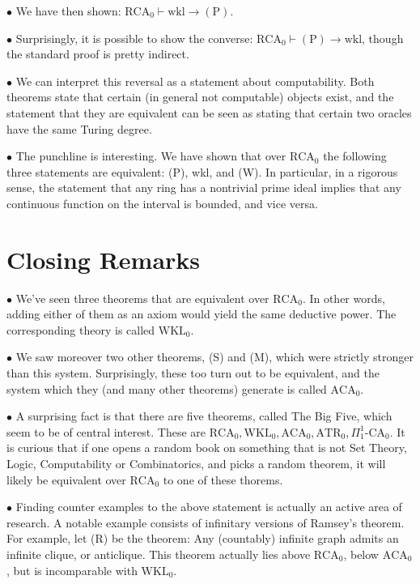 \documentclass{article}
\theoremstyle{nonumberplain}
\newcommand{\RCA}{\mathrm{RCA}}
\newcommand{\WKL}{\mathrm{WKL}}
\newcommand{\ACA}{\mathrm{ACA}}
\newcommand{\wkl}{\mathrm{wkl}}
\newcommand\point[1]{\noindent \hspace{\labelsep} $\bullet$ #1 \smallskip}
\newcommand\thname[1]{\mathrm{(#1)}}
\begin{document}
\point{We have then shown: $\RCA_0 \vdash \wkl \rightarrow \thname P$.}

\point{Surprisingly, it is possible to show the converse: $\RCA_0 \vdash \thname P \rightarrow \wkl$, though the standard proof is pretty indirect.}

\point{We can interpret this reversal as a statement about computability. Both theorems state that certain (in general not computable) objects exist, and the statement that they are equivalent can be seen as stating that certain two oracles have the same Turing degree.}

\point{The punchline is interesting. We have shown that over $\RCA_0$ the following three statements are equivalent: (P), wkl, and (W). In particular, in a rigorous sense, the statement that any ring has a nontrivial prime ideal implies that any continuous function on the interval is bounded, and vice versa.}

\section{Closing Remarks}

\point{We've seen three theorems that are equivalent over $\RCA_0$. In other words, adding either of them as an axiom would yield the same deductive power. The corresponding theory is called $\WKL_0$.}

\point{We saw moreover two other theorems, (S) and (M), which were strictly stronger than this system. Surprisingly, these too turn out to be equivalent, and the system which they (and many other theorems) generate is called $\ACA_0$.}

\point{A surprising fact is that there are five theorems, called The Big Five, which seem to be of central interest. These are $\RCA_0, \WKL_0, \ACA_0, \mathrm{ATR}_0, \Pi^1_1\text{-}\mathrm{CA}_0$. It is curious that if one opens a random book on something that is not Set Theory, Logic, Computability or Combinatorics, and picks a random theorem, it will likely be equivalent over $\RCA_0$ to one of these thorems.}

\point{Finding counter examples to the above statement is actually an active area of research. A notable example consists of infinitary versions of Ramsey's theorem. For example, let (R) be the theorem: Any (countably) infinite graph admits an infinite clique, or anticlique. This theorem actually lies above $\RCA_0$, below $\ACA_0$, but is incomparable with $\WKL_0$.}
\end{document}
